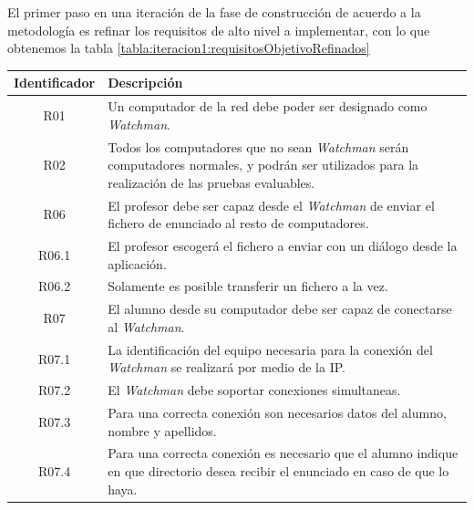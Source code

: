 El primer paso en una iteración de la fase de construcción de acuerdo a la metodología es refinar los requisitos de alto nivel a implementar, con lo que obtenemos la tabla \ref{tabla:iteracion1:requisitosObjetivoRefinados}

\begin{table}
    \begin{tabular}{|c|p{10cm}|}
        \hline
        \textbf{Identificador} & \textbf{Descripción}
        \\ \hline

        R01 & Un computador de la red debe poder ser designado como \emph{Watchman}.
        \\ \hline

        R02 & Todos los computadores que no sean \emph{Watchman} serán computadores
        normales, y podrán ser utilizados para la realización de las pruebas evaluables.
        \\ \hline

        R06 & El profesor debe ser capaz desde el \emph{Watchman} de enviar el fichero de enunciado al resto de computadores.
        \\ \hline
        
        R06.1 & El profesor escogerá el fichero a enviar con un diálogo desde la aplicación.
        \\ \hline
        
        R06.2 & Solamente es posible transferir un fichero a la vez.
        \\ \hline

        R07 & El alumno desde su computador debe ser capaz de conectarse al \emph{Watchman}.
        \\ \hline
        
        R07.1 & La identificación del equipo necesaria para la conexión del \emph{Watchman} se realizará por medio de la IP.
        \\ \hline
        
        R07.2 & El \emph{Watchman} debe soportar conexiones simultaneas.
        \\ \hline
        
        R07.3 & Para una correcta conexión son necesarios datos del alumno, nombre y apellidos.
        \\ \hline
        
        R07.4 & Para una correcta conexión es necesario que el alumno indique en que directorio desea recibir el enunciado en caso de que lo haya.
        \\ \hline
        

\end{tabular}
\end{table}
